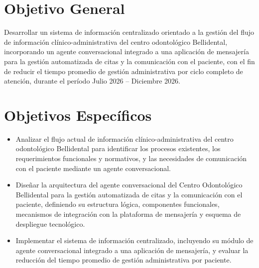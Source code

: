 \section{Objetivo General}

Desarrollar un sistema de información centralizado orientado a la gestión del flujo de información clínico-administrativa del centro odontológico Bellidental, incorporando un agente conversacional integrado a una aplicación de mensajería para la gestión automatizada de citas y la comunicación con el paciente, con el fin de reducir el tiempo promedio de gestión administrativa por ciclo completo de atención, durante el período Julio 2026 -- Diciembre 2026.

\section{Objetivos Específicos}

\begin{itemize}
    \item Analizar el flujo actual de información clínico-administrativa del centro odontológico Bellidental para identificar los procesos existentes, los requerimientos funcionales y normativos, y las necesidades de comunicación con el paciente mediante un agente conversacional.
    \item Diseñar la arquitectura del agente conversacional del Centro Odontológico Bellidental para la gestión automatizada de citas y la comunicación con el paciente, definiendo su estructura lógica, componentes funcionales, mecanismos de integración con la plataforma de mensajería y esquema de despliegue tecnológico.
    \item Implementar el sistema de información centralizado, incluyendo su módulo de agente conversacional integrado a una aplicación de mensajería, y evaluar la reducción del tiempo promedio de gestión administrativa por paciente.
\end{itemize}



